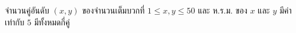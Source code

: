 \question จำนวนคู่อันดับ $(x, y)$ ของจำนวนเต็มบวกที่ $1 \leq x, y \leq 50$ และ ห.ร.ม. ของ $x$ และ $y$ มีค่าเท่ากับ $5$ มีทั้งหมดกี่คู่
\newline
{}
